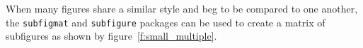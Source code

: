 \documentclass[]{aiaa-tc}%
\newcommand{\package}[1]{\texttt{#1}}
\begin{document}
When many figures share a similar style and beg to be compared to one
another, the \package{subfigmat} and \package{subfigure} packages can be
used to create a matrix of subfigures as shown by
figure~\vref{f:small_multiple}.
\begin{figure}
 \begin{subfigmatrix}{4}%

\end{subfigmatrix}
\end{figure}
\end{document}
